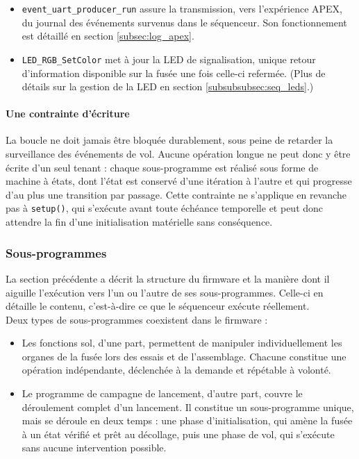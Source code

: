 \vspace{0.4cm}

\begin{itemize}
	\item \texttt{event\_uart\_producer\_run} assure la transmission, vers l'expérience APEX, du journal des événements
	survenus dans le séquenceur. Son fonctionnement est détaillé en section \ref{subsec:log_apex}.\\

	\item \texttt{LED\_RGB\_SetColor} met à jour la LED de signalisation, unique retour d'information disponible sur la fusée une
	fois celle-ci refermée. (Plus de détails sur la gestion de la LED en section \ref{subsubsubsec:seq_leds}.)
\end{itemize}

\paragraph*{Une contrainte d'écriture} La boucle ne doit jamais être bloquée durablement, sous peine de retarder la
surveillance des événements de vol. Aucune opération longue ne peut donc y être écrite d'un seul tenant : chaque
sous-programme est réalisé sous forme de machine à états, dont l'état est conservé d'une itération à l'autre et qui progresse
d'au plus une transition par passage. Cette contrainte ne s'applique en revanche pas à \texttt{setup()}, qui s'exécute avant
toute échéance temporelle et peut donc attendre la fin d'une initialisation matérielle sans conséquence.

\newpage

\subsubsection{Sous-programmes}
\label{subsubsec:seq_sous_programmes}

La section précédente a décrit la structure du firmware et la manière dont il aiguille l'exécution vers l'un ou l'autre de ses
sous-programmes. Celle-ci en détaille le contenu, c'est-à-dire ce que le séquenceur exécute réellement.\\

Deux types de sous-programmes coexistent dans le firmware :
\begin{itemize}
	\item Les fonctions sol, d'une part, permettent de manipuler individuellement les organes de la fusée lors des essais et de
	l'assemblage. Chacune constitue une opération indépendante, déclenchée à la demande et répétable à volonté.
	\item Le programme de campagne de lancement, d'autre part, couvre le déroulement complet d'un lancement. Il constitue un
	sous-programme unique, mais se déroule en deux temps : une phase d'initialisation, qui amène la fusée à un état vérifié et
	prêt au décollage, puis une phase de vol, qui s'exécute sans aucune intervention possible.
\end{itemize}

